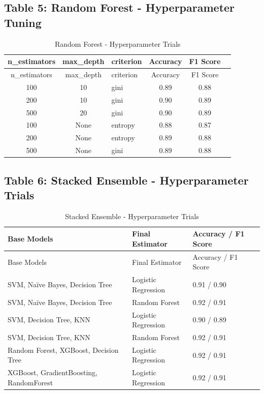 \documentclass[11pt]{article}
\begin{document}
\bigskip

\subsection{Table 5: Random Forest - Hyperparameter Tuning}
\begin{longtable}{c c l c c c}
\caption{Random Forest - Hyperparameter Trials}\\
\toprule
n\_estimators & max\_depth & criterion & Accuracy & F1 Score \\
\midrule
\endfirsthead
\toprule
n\_estimators & max\_depth & criterion & Accuracy & F1 Score \\
\midrule
\endhead
100 & 10 & gini & 0.89 & 0.88 \\
200 & 10 & gini & 0.90 & 0.89 \\
500 & 20 & gini & 0.90 & 0.89 \\
100 & None & entropy & 0.88 & 0.87 \\
200 & None & entropy & 0.89 & 0.88 \\
500 & None & gini & 0.89 & 0.88 \\
\bottomrule
\end{longtable}

\bigskip

\subsection{Table 6: Stacked Ensemble - Hyperparameter Trials}
\begin{longtable}{p{7.5cm} p{4cm} p{3.5cm}}
\caption{Stacked Ensemble - Hyperparameter Trials}\\
\toprule
Base Models & Final Estimator & Accuracy / F1 Score \\
\midrule
\endfirsthead
\toprule
Base Models & Final Estimator & Accuracy / F1 Score \\
\midrule
\endhead
SVM, Na\"ive Bayes, Decision Tree & Logistic Regression & 0.91 / 0.90 \\
SVM, Na\"ive Bayes, Decision Tree & Random Forest & 0.92 / 0.91 \\
SVM, Decision Tree, KNN & Logistic Regression & 0.90 / 0.89 \\
SVM, Decision Tree, KNN & Random Forest & 0.92 / 0.91 \\
Random Forest, XGBoost, Decision Tree & Logistic Regression & 0.92 / 0.91 \\
XGBoost, GradientBoosting, RandomForest & Logistic Regression & 0.92 / 0.91 \\
\bottomrule
\end{longtable}
\end{document}
